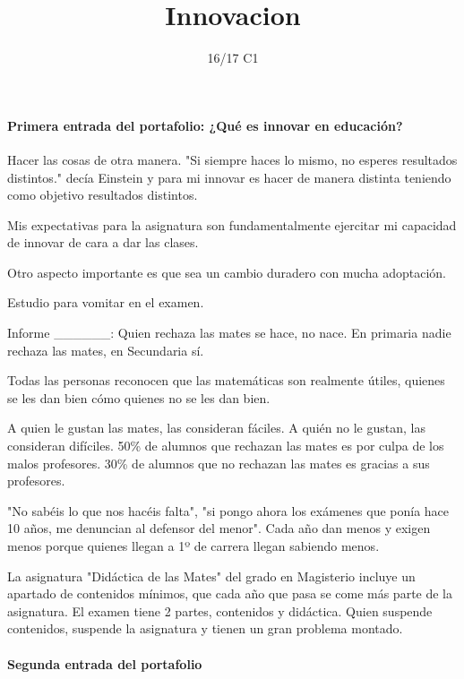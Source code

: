 \documentclass[palatino]{apuntes}
\title{Innovacion}
\author{}
\date{16/17 C1}
\begin{document}
\pagestyle{plain}
\maketitle

\tableofcontents
\newpage

\paragraph{Primera entrada del portafolio: ¿Qué es innovar en educación?}

Hacer las cosas de otra manera. "Si siempre haces lo mismo, no esperes resultados distintos." decía Einstein y para mi innovar es hacer de manera distinta teniendo como objetivo resultados distintos.

Mis expectativas para la asignatura son fundamentalmente ejercitar mi capacidad de innovar de cara a dar las clases. 


Otro aspecto importante es que sea un cambio duradero con mucha adoptación.

\begin{defn}
Estudio para vomitar en el examen.
\end{defn}


Informe ______:
Quien rechaza las mates se hace, no nace. En primaria nadie rechaza las mates, en Secundaria sí.

Todas las personas reconocen que las matemáticas son realmente útiles, quienes se les dan bien cómo quienes no se les dan bien.

A quien le gustan las mates, las consideran fáciles. A quién no le gustan, las consideran difíciles. 50\% de alumnos que rechazan las mates es por culpa de los malos profesores. 30\% de alumnos que no rechazan las mates es gracias a sus profesores. 

"No sabéis lo que nos hacéis falta", "si pongo ahora los exámenes que ponía hace 10 años, me denuncian al defensor del menor". Cada año dan menos y exigen menos porque quienes llegan a 1º de carrera llegan sabiendo menos.

La asignatura "Didáctica de las Mates" del grado en Magisterio incluye un apartado de contenidos mínimos, que cada año que pasa se come más parte de la asignatura. 
%
El examen tiene 2 partes, contenidos y didáctica. Quien suspende contenidos, suspende la asignatura y tienen un gran problema montado.


\paragraph{Segunda entrada del portafolio}
\end{document}
